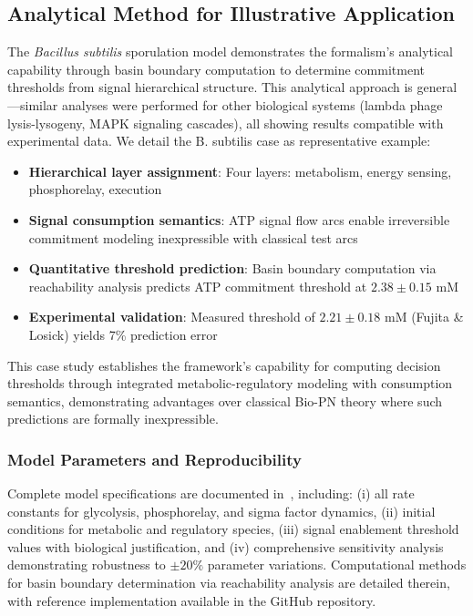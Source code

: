 \documentclass[10pt,letterpaper]{article}
\begin{document}
\subsection{Analytical Method for Illustrative Application}

The \textit{Bacillus subtilis} sporulation model demonstrates the formalism's analytical capability through basin boundary computation to determine commitment thresholds from signal hierarchical structure. This analytical approach is general---similar analyses were performed for other biological systems (lambda phage lysis-lysogeny, MAPK signaling cascades), all showing results compatible with experimental data. We detail the B. subtilis case as representative example:

\begin{itemize}
\item \textbf{Hierarchical layer assignment}: Four layers: metabolism, energy sensing, phosphorelay, execution
\item \textbf{Signal consumption semantics}: ATP signal flow arcs enable irreversible commitment modeling inexpressible with classical test arcs
\item \textbf{Quantitative threshold prediction}: Basin boundary computation via reachability analysis predicts ATP commitment threshold at $2.38 \pm 0.15$ mM
\item \textbf{Experimental validation}: Measured threshold of $2.21 \pm 0.18$ mM (Fujita \& Losick) yields 7\% prediction error
\end{itemize}

This case study establishes the framework's capability for computing decision thresholds through integrated metabolic-regulatory modeling with consumption semantics, demonstrating advantages over classical Bio-PN theory where such predictions are formally inexpressible.

\subsubsection{Model Parameters and Reproducibility}

Complete model specifications are documented in~\cite{subtilis2026}, including: (i) all rate constants for glycolysis, phosphorelay, and sigma factor dynamics, (ii) initial conditions for metabolic and regulatory species, (iii) signal enablement threshold values with biological justification, and (iv) comprehensive sensitivity analysis demonstrating robustness to $\pm 20\%$ parameter variations. Computational methods for basin boundary determination via reachability analysis are detailed therein, with reference implementation available in the GitHub repository.
\end{document}
